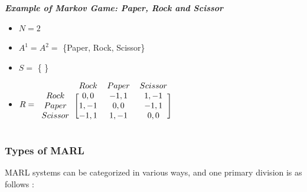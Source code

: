 \documentclass{scrartcl}
\begin{document}
\begin{boxK}
\textbf{\textit{Example of Markov Game: Paper, Rock and Scissor}}

  \begin{itemize}
    \item $N = 2$
    \item $A^1 = A^2 = $ \{Paper, Rock, Scissor\}
    \item $S = $ \{ \}
    \item $R = \begin{blockarray}{cccc}
      & Rock & Paper & Scissor \\
    \begin{block}{c[ccc]}
      Rock    & 0, 0  & -1, 1 & 1, -1 \\
      Paper   & 1, -1 & 0, 0  & -1, 1 \\
      Scissor & -1, 1 & 1, -1 & 0, 0 \\
    \end{block}
  \end{blockarray}$
  \end{itemize}
\end{boxK}

\subsubsection{Types of MARL}
MARL systems can be categorized in various ways, and one primary division is as follows \cite{4445757}:

%     
\end{document}
